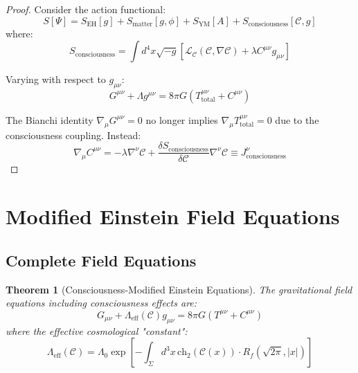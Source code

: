 \documentclass[12pt,letterpaper]{article}
\newtheorem{theorem}{Theorem}[section]
\newcommand{\RF}{R_f}
\newcommand{\chh}{\mathrm{ch}_2}
\newcommand{\Cmunu}{C^{\mu\nu}}
\newcommand{\Tmunu}{T^{\mu\nu}}
\begin{document}
\begin{proof}
Consider the action functional:
\begin{equation}
S[\Psi] = S_\mathrm{EH}[g] + S_\mathrm{matter}[g,\phi] + S_\mathrm{YM}[A] + S_\mathrm{consciousness}[\mathcal{C},g]
\end{equation}
where:
\begin{equation}
S_\mathrm{consciousness} = \int d^4x \sqrt{-g} \left[ \mathcal{L}_\mathcal{C}(\mathcal{C}, \nabla\mathcal{C}) + \lambda \Cmunu g_{\mu\nu} \right]
\end{equation}

Varying with respect to $g_{\mu\nu}$:
\begin{equation}
G^{\mu\nu} + \Lambda g^{\mu\nu} = 8\pi G \left( \Tmunu_\mathrm{total} + \Cmunu \right)
\end{equation}

The Bianchi identity $\nabla_\mu G^{\mu\nu} = 0$ no longer implies $\nabla_\mu \Tmunu_\mathrm{total} = 0$ due to the consciousness coupling. Instead:
\begin{equation}
\nabla_\mu \Cmunu = -\lambda \nabla^\nu \mathcal{C} + \frac{\delta S_\mathrm{consciousness}}{\delta \mathcal{C}} \nabla^\nu \mathcal{C} \equiv J^\nu_\mathrm{consciousness}
\end{equation}
\end{proof}

\section{Modified Einstein Field Equations}

\subsection{Complete Field Equations}

\begin{theorem}[Consciousness-Modified Einstein Equations]
The gravitational field equations including consciousness effects are:
\begin{equation}
\boxed{G_{\mu\nu} + \Lambda_\mathrm{eff}(\mathcal{C}) g_{\mu\nu} = 8\pi G \left( \Tmunu + \Cmunu \right)}
\end{equation}
where the effective cosmological "constant":
\begin{equation}
\Lambda_\mathrm{eff}(\mathcal{C}) = \Lambda_0 \exp\left[ -\int_\Sigma d^3x \, \chh(\mathcal{C}(x)) \cdot \RF(\sqrt{2\pi}, |x|) \right]
\end{equation}
\end{theorem}
\end{document}
